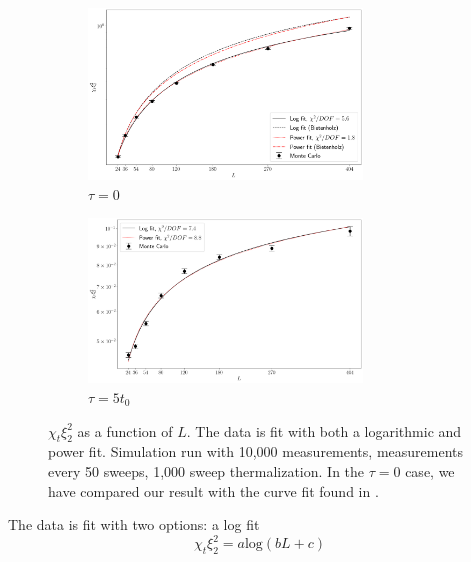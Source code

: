 \begin{figure}[h!]
    \begin{center}
      \begin{subfigure}[b]{\textwidth}
          \centering
          \includegraphics[width=0.8\textwidth]{imgs/divergence.png}
          \caption{$\tau = 0$}
      \end{subfigure}

      \begin{subfigure}[b]{\textwidth}
          \centering
          \includegraphics[width=0.8\textwidth]{imgs/divergence_flowed.png}
          \caption{$\tau = 5t_0$}
      \end{subfigure}
      \caption{\label{fig:divergence} $\chi_t\xi_2^2$ as a function of $L$. The data is fit with both a logarithmic and power fit. Simulation run with 10,000 measurements, measurements every 50 sweeps, 1,000 sweep thermalization. In the $\tau=0$ case, we have compared our result with the curve fit found in \cite{bietenholz2018}.}
    \end{center}
\end{figure}
The data is fit with two options: a log fit
\begin{equation}
    \chi_t \xi_2^2 = a \mathrm{log}(b L + c)
\end{equation}
